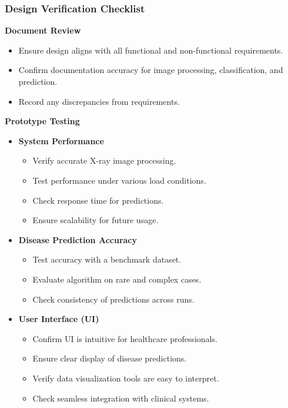 \documentclass[12pt, titlepage]{article}
\begin{document}
\subsubsection{Design Verification Checklist}

\textbf{Document Review}
    \begin{itemize}
        \item Ensure design aligns with all functional and non-functional requirements.
        \item Confirm documentation accuracy for image processing, classification, and prediction.
        \item Record any discrepancies from requirements.
    \end{itemize}
\textbf{Prototype Testing}
\begin{itemize}
    \item \textbf{System Performance}
    \begin{itemize}
        \item Verify accurate X-ray image processing.
        \item Test performance under various load conditions.
        \item Check response time for predictions.
        \item Ensure scalability for future usage.
    \end{itemize}

\item \textbf{Disease Prediction Accuracy}
    \begin{itemize}
        \item Test accuracy with a benchmark dataset.
        \item Evaluate algorithm on rare and complex cases.
        \item Check consistency of predictions across runs.
    \end{itemize}

    \item \textbf{User Interface (UI)}
    \begin{itemize}
        \item Confirm UI is intuitive for healthcare professionals.
        \item Ensure clear display of disease predictions.
        \item Verify data visualization tools are easy to interpret.
        \item Check seamless integration with clinical systems.
    \end{itemize}


\end{itemize}
\end{document}
